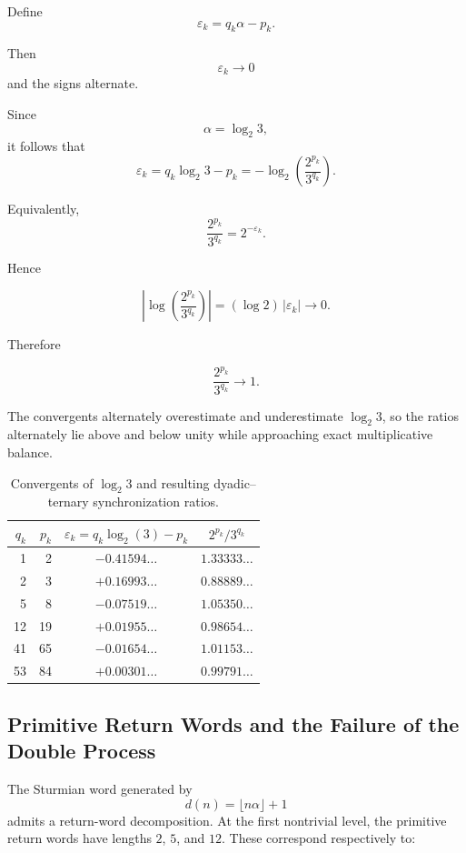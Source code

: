 \documentclass[12pt, oneside]{article}
\numberwithin{equation}{section}
\theoremstyle{definition}
\theoremstyle{plain}
\theoremstyle{remark}
\begin{document}
Define
\[
\varepsilon_k = q_k\alpha-p_k.
\]

Then
\[
\varepsilon_k \to 0
\]
and the signs alternate.

Since
\[
\alpha=\log_2 3,
\]
it follows that
\[
\varepsilon_k = q_k\log_2 3-p_k = -\log_2\!\left(\frac{2^{p_k}}{3^{q_k}}\right).
\]

Equivalently,
\[
\frac{2^{p_k}}{3^{q_k}} = 2^{-\varepsilon_k}.
\]

Hence

\[
\left|
\log\!\left(
\frac{2^{p_k}}{3^{q_k}}
\right)
\right|
=
(\log 2)\,|\varepsilon_k|
\to0.
\]

Therefore

\[
\frac{2^{p_k}}{3^{q_k}}
\to1.
\]

The convergents alternately overestimate and underestimate
$\log_2 3$, so the ratios alternately lie above and below unity while
approaching exact multiplicative balance.

\begin{table}[ht]
\centering
\caption{Convergents of $\log_2 3$ and resulting
dyadic--ternary synchronization ratios.}
\label{tab:tower-ratios}
\begin{tabular}{r r c c}
\hline
$q_k$ & $p_k$ &
$\varepsilon_k=q_k\log_2(3)-p_k$ &
$\displaystyle 2^{p_k} / 3^{q_k}$ \\
\hline
 1 &  2 & $-0.41594\ldots$ & $1.33333\ldots$ \\
 2 &  3 & $+0.16993\ldots$ & $0.88889\ldots$ \\
 5 &  8 & $-0.07519\ldots$ & $1.05350\ldots$ \\
12 & 19 & $+0.01955\ldots$ & $0.98654\ldots$ \\
41 & 65 & $-0.01654\ldots$ & $1.01153\ldots$ \\
53 & 84 & $+0.00301\ldots$ & $0.99791\ldots$ \\
\hline
\end{tabular}
\end{table}

\subsection{Primitive Return Words and the Failure of the Double Process}

The Sturmian word generated by
\[
d(n)=\lfloor n\alpha\rfloor+1
\]
admits a return-word decomposition.  At the first nontrivial level, the primitive
return words have lengths $2$, $5$, and $12$. These correspond respectively to:
\end{document}
